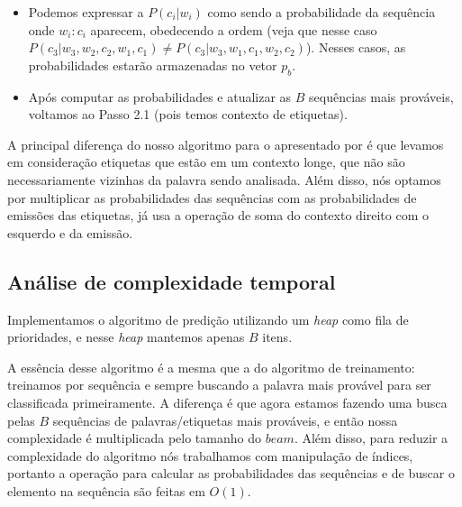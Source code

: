 \begin{itemize}
\item[\ ] Podemos expressar a $P(c_i | w_i)$ como sendo a probabilidade da sequência onde $w_i:c_i$ aparecem, obedecendo a ordem (veja que nesse caso $P(c_3|w_3,w_2,c_2,w_1,c_1) \not = P(c_3|w_3,w_1,c_1,w_2,c_2)$). Nesses casos, as probabilidades estarão armazenadas no vetor $p_b$.

\item[\ ] Após computar as probabilidades e atualizar as $B$ sequências mais prováveis, voltamos ao Passo 2.1 (pois temos contexto de etiquetas).

\end{itemize}

A principal diferença do nosso algoritmo para o apresentado por  é que levamos em consideração etiquetas que estão em um contexto longe, que não são necessariamente vizinhas da palavra sendo analisada. Além disso, nós optamos por multiplicar as probabilidades das sequências com as probabilidades de emissões das etiquetas, já  usa a operação de soma do contexto direito com o esquerdo e da emissão.





\subsection{Análise de complexidade temporal}

Implementamos o algoritmo de predição utilizando um \textit{heap} como fila de prioridades, e nesse \textit{heap} mantemos apenas $B$ itens.

A essência desse algoritmo é a mesma que a do algoritmo de treinamento: treinamos por sequência e sempre buscando a palavra mais provável para ser classificada primeiramente. A diferença é que agora estamos fazendo uma busca pelas $B$ sequências de palavras/etiquetas mais prováveis, e então nossa complexidade é multiplicada pelo tamanho do $beam$. Além disso, para reduzir a complexidade do algoritmo nós trabalhamos com manipulação de índices, portanto a operação para calcular as probabilidades das sequências e de buscar o elemento na sequência são feitas em $O(1)$.

